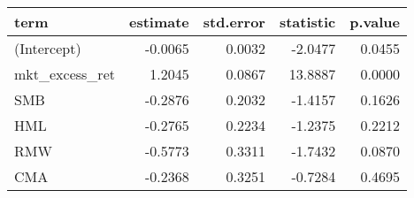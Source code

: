 \begin{table}[ht]
\centering
\begin{tabular}{lrrrr}
  \hline
term & estimate & std.error & statistic & p.value \\ 
  \hline
(Intercept) & -0.0065 & 0.0032 & -2.0477 & 0.0455 \\ 
  mkt\_excess\_ret & 1.2045 & 0.0867 & 13.8887 & 0.0000 \\ 
  SMB & -0.2876 & 0.2032 & -1.4157 & 0.1626 \\ 
  HML & -0.2765 & 0.2234 & -1.2375 & 0.2212 \\ 
  RMW & -0.5773 & 0.3311 & -1.7432 & 0.0870 \\ 
  CMA & -0.2368 & 0.3251 & -0.7284 & 0.4695 \\ 
   \hline
\end{tabular}
\end{table}

